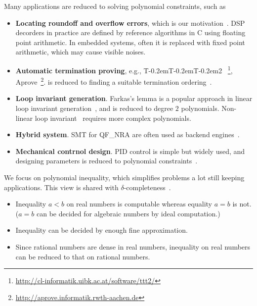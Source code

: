 \documentclass[runningheads,a4paper,oribibl]{llncs}
\newcommand\TTTT{%
 \textsf{T\kern-0.2em\raisebox{-0.3em}T\kern-0.2emT\kern-0.2em\raisebox{-0.3em}2}%
}
\begin{document}
Many applications are reduced to solving polynomial constraints, such as 
\begin{itemize}
\item {\bf Locating roundoff and overflow errors}, 
which is our motivation~\cite{ngocsefm,ngocase}. 
DSP decorders in practice are defined by reference algorithms in C using floating point arithmetic. 
In embedded systems, often it is replaced with fixed point arithmetic, 
which may cause visible noises. 

\item {\bf Automatic termination proving}, 
e.g., \TTTT~\footnote{\url{http://cl-informatik.uibk.ac.at/software/ttt2/}}, 
Aprove~\footnote{\url{http://aprove.informatik.rwth-aachen.de}}. 
is reduced to finding a suitable termination ordering~\cite{lucas}. 

\item {\bf Loop invariant generation}.
Farkas's lemma is a popular approach in linear loop invariant generation~\cite{Colon03}, 
and is reduced to degree $2$ polynomials. 
Non-linear loop invariant~\cite{Sankaranarayanan} requires more complex polynomials.

\item {\bf Hybrid system}. SMT for QF\_NRA are often used as backend engines~\cite{hybrid}. 

\item {\bf Mechanical contrnol design}. 
PID control is simple but widely used, and designing parameters is 
reduced to polynomial constraints~\cite{control}. 
\end{itemize}	

We focus on polynomial inequality, which simplifies problems a lot still 
keeping applications. 
This view is shared with $\delta$-completeness~\cite{dRealIJCAR12,dRealLICS12}. 
\begin{itemize}
\item %
Inequality $a < b$ on real numbers is computable 
whereas equality $a = b$ is not. ($a=b$ can be decided for algebraic numbers by 
ideal computation.)
\item Inequality can be decided by enough fine approximation. 
\item Since rational numbers are dense in real numbers, 
inequality on real numbers can be reduced to that on rational numbers. 
\end{itemize}
\end{document}
